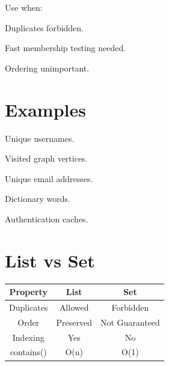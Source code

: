 \documentclass[11pt,a4paper]{book}
\begin{document}
Use when:


Duplicates forbidden.


Fast membership testing needed.


Ordering unimportant.


\section{Examples}


Unique usernames.


Visited graph vertices.


Unique email addresses.


Dictionary words.


Authentication caches.


\section{List vs Set}

\begin{center}

\begin{tabular}{|c|c|c|}
\hline
Property &
List &
Set \\
\hline

Duplicates &
Allowed &
Forbidden \\
\hline

Order &
Preserved &
Not Guaranteed \\
\hline

Indexing &
Yes &
No \\
\hline

contains()
&
O(n)
&
O(1)
\\
\hline

\end{tabular}

\end{center}
\end{document}
